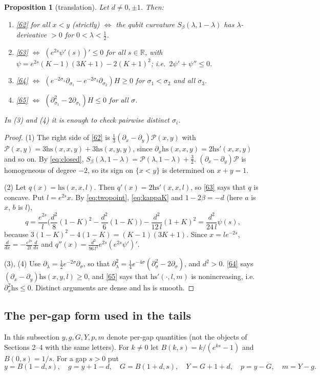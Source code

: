 \documentclass[11pt]{amsart}
\newtheorem{proposition}[theorem]{Proposition}
\theoremstyle{definition}
\numberwithin{equation}{section}
\newcommand{\R}{\mathbb{R}}
\newcommand{\hs}{\mathrm{hs}}
\begin{document}
\begin{proposition}[translation]\label{prop:translate}
Let $d\ne0,\pm1$. Then:
\begin{enumerate}
\item \eqref{62} for all $x<y$ (strictly) $\iff$ the qubit curvature $S_\beta(\lambda,1-\lambda)$ has $\lambda$-derivative $>0$ for $0<\lambda<\frac12$.
\item \eqref{63} $\iff$ $(e^{2s}\psi'(s))'\le0$ for all $s\in\R$, with $\psi=e^{2s}(K-1)(3K+1)-2(K+1)^2$; i.e.\ $2\psi'+\psi''\le0$.
\item \eqref{64} $\iff$ $(e^{-2\sigma_1}\partial_{\sigma_1}-e^{-2\sigma_2}\partial_{\sigma_2})H\ge0$ for $\sigma_1<\sigma_2$ and all $\sigma_3$.
\item \eqref{65} $\iff$ $(\partial_{\sigma_1}^2-2\partial_{\sigma_1})H\le0$ for all $\sigma$.
\end{enumerate}
In (3) and (4) it is enough to check pairwise distinct $\sigma_i$.
\end{proposition}
\begin{proof}
(1) The right side of \eqref{62} is $\frac13(\partial_x-\partial_y)\mathcal P(x,y)$ with $\mathcal P(x,y)=3\hs(x,x,y)+3\hs(x,y,y)$, since $\partial_x\hs(x,x,y)=2\hs'(x,x,y)$ and so on. By
\eqref{eq:closed}, $S_\beta(\lambda,1-\lambda)=\mathcal P(\lambda,1-\lambda)+\frac32$. $(\partial_x-\partial_y)\mathcal P$ is homogeneous of degree $-2$, so its sign on $\{x<y\}$ is determined on $x+y=1$.

(2) Let $q(x)=\hs(x,x,l)$. Then $q'(x)=2\hs'(x,x,l)$, so \eqref{63} says that $q$ is concave. Put $l=e^{2s}x$. By \eqref{eq:twopoint}, \eqref{eq:kappaK} and $1-2\beta=-d$ (here $a$ is $x$, $b$ is $l$),
\[q=\frac{e^{2s}}l\Big(\frac{d^2}8(1-K)^2-\frac{d^2}6(1-K)\Big)-\frac{d^2}{12\,l}(1+K)^2=\frac{d^2}{24\,l}\psi(s),\]
because $3(1-K)^2-4(1-K)=(K-1)(3K+1)$. Since $x=le^{-2s}$, $\frac d{dx}=-\frac{e^{2s}}{2l}\frac d{ds}$ and $q''(x)=\frac{d^2}{96\,l^3}e^{2s}(e^{2s}\psi')'$.

(3), (4) Use $\partial_\lambda=\frac12e^{-2\sigma}\partial_\sigma$, so that $\partial_\lambda^2=\frac14e^{-4\sigma}(\partial_\sigma^2-2\partial_\sigma)$, and $d^2>0$. \eqref{64} says $(\partial_x-\partial_y)\hs(x,y,l)\ge0$, and
\eqref{65} says that $\hs'(\cdot,l,m)$ is nonincreasing, i.e.\ $\partial_x^2\hs\le0$. Distinct arguments are dense and $\hs$ is smooth.
\end{proof}

\subsection*{The per-gap form used in the tails} In this subsection $y,g,G,Y,p,m$ denote per-gap quantities (not the objects of Sections 2--4 with the same letters). For $k\ne 0$ let $B(k,s)=k/(e^{ks}-1)$ and $B(0,s)=1/s$. For a gap $s>0$ put
\[y=B(1-d,s),\quad g=y+1-d,\quad G=B(1+d,s),\quad Y=G+1+d,\quad p=y-G,\quad m=Y-g .\]
\end{document}

